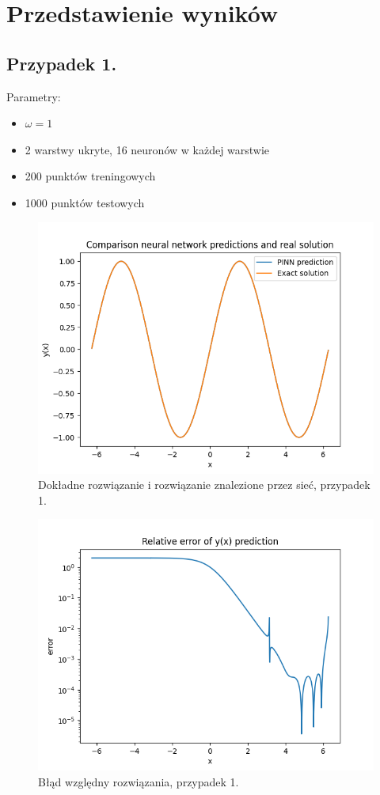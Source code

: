 \documentclass[11pt, leqno]{scrartcl}
\begin{document}
    \section{Przedstawienie wyników}
    \subsection{Przypadek 1.}
    Parametry:
    \begin{itemize}
        \item $\omega =1$
        \item 2 warstwy ukryte, 16 neuronów w każdej warstwie
        \item 200 punktów treningowych
        \item 1000 punktów testowych
    \end{itemize}
    \begin{figure}[H]
        \centering
        \includegraphics[width=0.7\linewidth]{nn_a_f.png}
        \caption{Dokładne rozwiązanie i rozwiązanie znalezione
            przez sieć, przypadek 1.}
    \end{figure}
    \begin{figure}[H]
        \centering
        \includegraphics[width=0.7\linewidth]{nn_a_err.png}
        \caption{Błąd względny rozwiązania, przypadek 1.}
    \end{figure}
\end{document}
